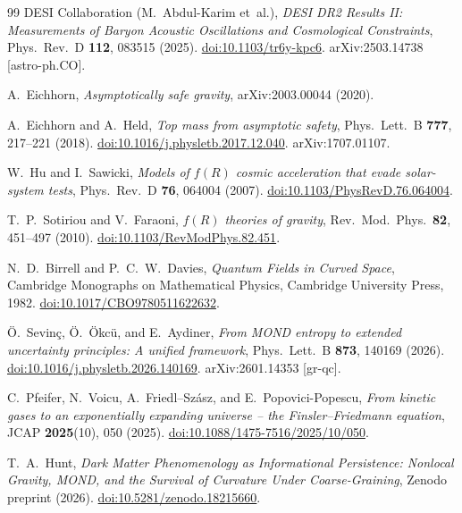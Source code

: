 \documentclass[12pt,a4paper]{article}
\theoremstyle{definition}
\theoremstyle{plain}
\theoremstyle{remark}
\begin{document}
\begin{thebibliography}{99}
DESI Collaboration (M.~Abdul-Karim et~al.),
\textit{DESI DR2 Results II: Measurements of Baryon Acoustic Oscillations and Cosmological Constraints},
Phys.\ Rev.\ D \textbf{112}, 083515 (2025).
\href{https://doi.org/10.1103/tr6y-kpc6}{doi:10.1103/tr6y-kpc6}.
arXiv:2503.14738 [astro-ph.CO].

A.~Eichhorn,
\textit{Asymptotically safe gravity},
arXiv:2003.00044 (2020).

A.~Eichhorn and A.~Held,
\textit{Top mass from asymptotic safety},
Phys.\ Lett.\ B \textbf{777}, 217--221 (2018).
\href{https://doi.org/10.1016/j.physletb.2017.12.040}{doi:10.1016/j.physletb.2017.12.040}.
arXiv:1707.01107.

W.~Hu and I.~Sawicki,
\textit{Models of $f(R)$ cosmic acceleration that evade solar-system tests},
Phys.\ Rev.\ D \textbf{76}, 064004 (2007).
\href{https://doi.org/10.1103/PhysRevD.76.064004}{doi:10.1103/PhysRevD.76.064004}.

T.~P.~Sotiriou and V.~Faraoni,
\textit{$f(R)$ theories of gravity},
Rev.\ Mod.\ Phys.\ \textbf{82}, 451--497 (2010).
\href{https://doi.org/10.1103/RevModPhys.82.451}{doi:10.1103/RevModPhys.82.451}.

N.~D.~Birrell and P.~C.~W.~Davies,
\textit{Quantum Fields in Curved Space},
Cambridge Monographs on Mathematical Physics, Cambridge University Press, 1982.
\href{https://doi.org/10.1017/CBO9780511622632}{doi:10.1017/CBO9780511622632}.

Ö.~Sevinç, Ö.~Ökcü, and E.~Aydiner,
\textit{From MOND entropy to extended uncertainty principles: A unified framework},
Phys.\ Lett.\ B \textbf{873}, 140169 (2026).
\href{https://doi.org/10.1016/j.physletb.2026.140169}{doi:10.1016/j.physletb.2026.140169}.
arXiv:2601.14353 [gr-qc].

C.~Pfeifer, N.~Voicu, A.~Friedl--Szász, and E.~Popovici-Popescu,
\textit{From kinetic gases to an exponentially expanding universe -- the Finsler--Friedmann equation},
JCAP \textbf{2025}(10), 050 (2025).
\href{https://doi.org/10.1088/1475-7516/2025/10/050}{doi:10.1088/1475-7516/2025/10/050}.

T.~A.~Hunt,
\textit{Dark Matter Phenomenology as Informational Persistence: Nonlocal Gravity, MOND, and the Survival of Curvature Under Coarse-Graining},
Zenodo preprint (2026).
\href{https://doi.org/10.5281/zenodo.18215660}{doi:10.5281/zenodo.18215660}.


\end{thebibliography}
\end{document}
